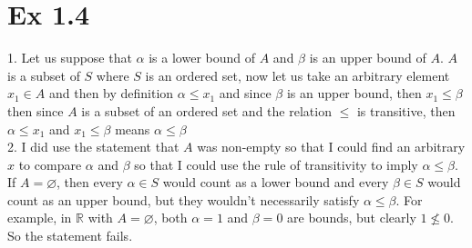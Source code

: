 \documentclass{report}
\begin{document}
\section*{Ex 1.4}


\begin{proofWithHibiscus}
  1. Let us suppose that $\alpha$ is a lower bound of $A$ and $\beta$ is an upper bound of $A$. $A$ is a subset of $S$ where $S$ is an ordered set, now let us take an arbitrary element $x_{1} \in A$ and then by definition $\alpha \leq x_{1}$  and since $\beta$ is an upper bound, then $x_{1} \leq \beta$ then since $A$ is a subset of an ordered set and the relation $\leq $ is transitive, then $\alpha \leq x_{1}$ and $x_{1} \leq \beta$ means $\alpha \leq \beta$  \\

  2. I did use the statement that $A$ was non-empty so that I could find an arbitrary $x$ to compare $\alpha$ and $\beta$ so that I could use the rule of transitivity to imply $\alpha \leq \beta$. If $A = \varnothing$, then every $\alpha \in S$ would count as a lower bound and every $\beta \in S$ would count as an upper bound, but they wouldn’t necessarily satisfy $\alpha \leq \beta$. For example, in $\mathbb{R}$ with $A = \varnothing$, both $\alpha = 1$ and $\beta = 0$ are bounds, but clearly $1 \nleq 0$. So the statement fails. 
\end{proofWithHibiscus}
\end{document}
